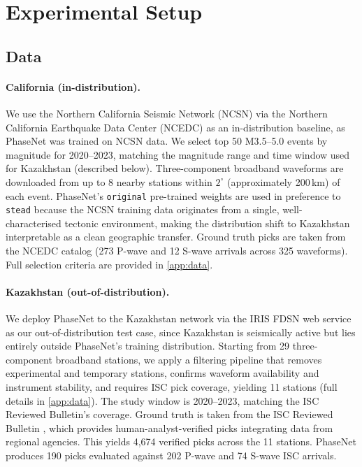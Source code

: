 \section{Experimental Setup}
\label{sec:setup}

\subsection{Data}
\label{sec:data}

\paragraph{California (in-distribution).} We use the Northern California Seismic Network (NCSN) via the Northern California Earthquake Data Center (NCEDC) as an in-distribution baseline, as PhaseNet was trained on NCSN data. We select top 50 M3.5--5.0 events by magnitude for 2020--2023, matching the magnitude range and time window used for Kazakhstan (described below). Three-component broadband waveforms are downloaded from up to 8 nearby stations within $2^\circ$ (approximately 200\,km) of each event. PhaseNet's \texttt{original} pre-trained weights are used in preference to \texttt{stead} because the NCSN training data originates from a single, well-characterised tectonic environment, making the distribution shift to Kazakhstan interpretable as a clean geographic transfer. Ground truth picks are taken from the NCEDC catalog (273 P-wave and 12 S-wave arrivals across 325 waveforms). Full selection criteria are provided in \cref{app:data}.

\paragraph{Kazakhstan (out-of-distribution).} We deploy PhaseNet to the Kazakhstan network via the IRIS FDSN web service as our out-of-distribution test case, since Kazakhstan is seismically active but lies entirely outside PhaseNet's training distribution. Starting from 29 three-component broadband stations, we apply a filtering pipeline that removes experimental and temporary stations, confirms waveform availability and instrument stability, and requires ISC pick coverage, yielding 11 stations (full details in \cref{app:data}). The study window is 2020--2023, matching the ISC Reviewed Bulletin's coverage. Ground truth is taken from the ISC Reviewed Bulletin \citep{isc2023}, which provides human-analyst-verified picks integrating data from regional agencies. This yields 4{,}674 verified picks across the 11 stations. PhaseNet produces 190 picks evaluated against 202 P-wave and 74 S-wave ISC arrivals.

